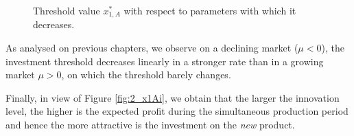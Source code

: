 \begin{figure}[!htb]
	\begin{subfigmatrix}{2}
	\end{subfigmatrix}
	\caption{Threshold value $x^*_{1,A}$ with respect to parameters with which it decreases.}
	\label{fig:2_x1Ad}
\end{figure}


As analysed on previous chapters, we observe on a declining market ($\mu<0$), the investment threshold decreases linearly in a stronger rate than in a growing market $\mu>0$, on which the threshold barely changes.
 
Finally, in view of Figure \ref{fig:2_x1Ai}, we obtain that the larger the innovation level, the higher is the expected profit during the simultaneous production period and hence the more attractive is the investment on the \textit{new} product.






